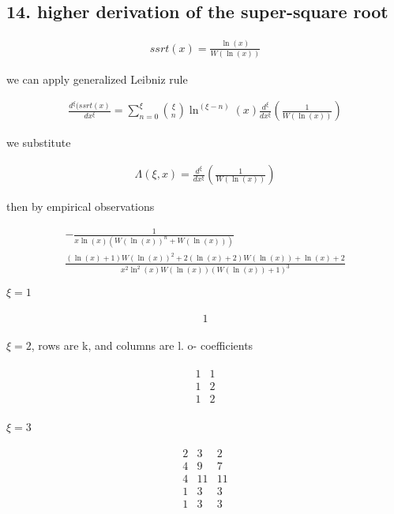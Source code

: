 \subsection{14. higher derivation of the super-square root}

\begin{align}
      ssrt(x) = \frac{\ln(x)}{W(\ln(x))}
\end{align}

we can apply generalized Leibniz rule

\begin{align}
      \frac{d^\xi(ssrt(x)}{dx^\xi}=\sum_{n=0}^\xi 
      \binom{\xi}{n}\ln^{(\xi-n)}(x)\frac{d^\xi}{
      dx^\xi}\left(\frac{1}{W(\ln(x))}\right)
\end{align}

we substitute

\begin{align}
      \Lambda(\xi, x)= \frac{d^\xi}{dx^\xi}
      \left(\frac{1}{W(\ln(x))}\right)
\end{align}

then by empirical observations

\begin{align}
      -\frac{1}{x\ln(x)(W(\ln(x))^n+W(\ln(x)))} \\
      \frac{(\ln(x)+1)W(\ln(x))^2 +2(\ln(x)+2)W(\ln(x))
      +\ln(x)+2}{x^2\ln^2(x) W(\ln(x))(W(\ln(x))+1)^3}
\end{align}

\(\xi=1\)

\begin{align}
      \begin{matrix}
            1      
      \end{matrix}
\end{align}

\(\xi=2\), rows are k, and columns are l. o- coefficients

\begin{align}
      \begin{matrix}
            1 & 1 \\
            1 & 2 \\
            1 & 2 \\
      \end{matrix}
\end{align}

\(\xi=3\)

\begin{align}
      \begin{matrix}
            2 & 3 & 2 \\
            4 & 9 & 7 \\
            4 & 11 & 11 \\
            1 & 3 & 3 \\
            1 & 3 & 3 \\
      \end{matrix}
\end{align}

